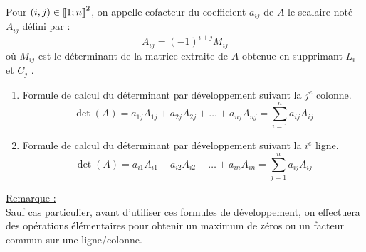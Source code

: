 \begin{defprop}
    Pour \((i, j) \in  \left\llbracket1;n\right\rrbracket^2\), on appelle cofacteur du coefficient \(a_{ij}\) de \(A\) le scalaire noté \(A_{ij}\) défini par :
    \[A_{ij} = (-1)^{i+j} M_{ij}\]
    où \(M_{ij}\) est le déterminant de la matrice extraite de \(A\) obtenue en supprimant \(L_i\) et \(C_j\) .
    \begin{enumerate}
        \item Formule de calcul du déterminant par développement suivant la \(j^e\) colonne.
        \[\det(A) = a_{1j} A_{1j} + a_{2j} A_{2j} + \dots + a_{nj} A_{nj} = \sum^n_{i=1} a_{ij} A_{ij}\] 
        \item Formule de calcul du déterminant par développement suivant la \(i^e\) ligne.
        \[\det(A) = a_{i1}A_{i1} + a_{i2}A_{i2} + \dots + a_{in}A_{in} = \sum^n_{j=1} a_{ij} A_{ij} \]
    \end{enumerate}
    \underline{Remarque :}\\
    Sauf cas particulier, avant d’utiliser ces formules de développement, on effectuera des opérations élémentaires pour obtenir un maximum de zéros ou un facteur commun sur une ligne/colonne.
\end{defprop}
